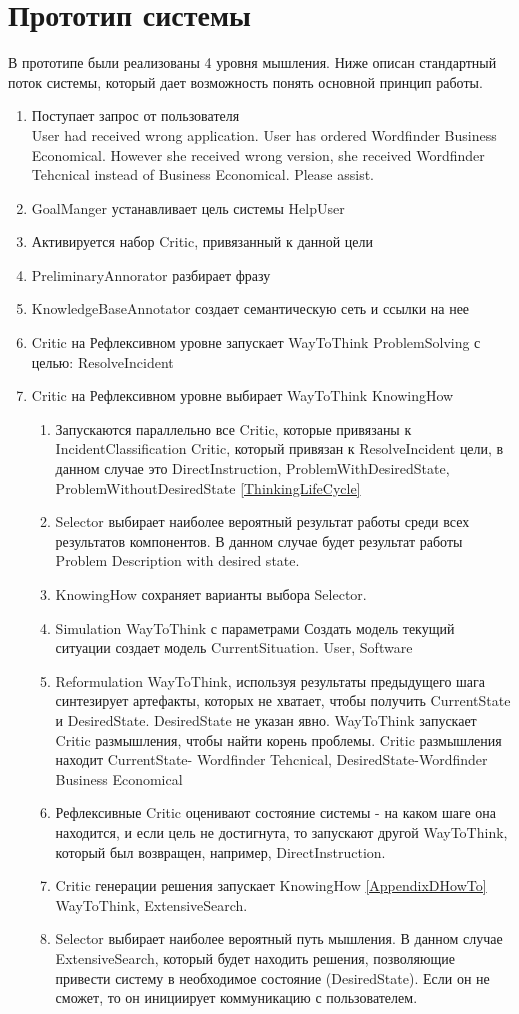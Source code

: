 \section{Прототип системы}
В прототипе были реализованы 4 уровня мышления. Ниже описан стандартный поток системы, который дает возможность понять основной принцип работы.
\begin{enumerate}
	\item Поступает запрос от пользователя \\
	User had received wrong application.
User has ordered Wordfinder Business Economical.
However she received wrong version, she received Wordfinder Tehcnical instead of Business Economical. Please assist.
	\item GoalManger устанавливает цель системы HelpUser
	\item Активируется набор Critic, привязанный к данной цели
	\item PreliminaryAnnorator разбирает фразу
	\item KnowledgeBaseAnnotator создает семантическую сеть и ссылки на нее
	\item Critic на Рефлексивном уровне запускает WayToThink ProblemSolving с целью: ResolveIncident
	\item Critic на Рефлексивном уровне выбирает WayToThink KnowingHow
	\begin{enumerate}
	\item Запускаются параллельно все Critic, которые привязаны к IncidentClassification Critic, который привязан к ResolveIncident цели, в данном случае это DirectInstruction, ProblemWithDesiredState, ProblemWithoutDesiredState \ref{ThinkingLifeCycle}
	\item Selector выбирает наиболее вероятный результат работы среди всех результатов компонентов. В данном случае будет результат работы Problem Description with desired state.
	\item KnowingHow сохраняет варианты выбора Selector.
	\item Simulation WayToThink с параметрами Создать модель текущий ситуации создает модель CurrentSituation. User, Software
	\item Reformulation WayToThink, используя результаты предыдущего шага синтезирует артефакты, которых не хватает, чтобы получить CurrentState и DesiredState. DesiredState не указан явно. WayToThink запускает Critic размышления, чтобы найти корень проблемы. Critic размышления находит CurrentState- Wordfinder Tehcnical, DesiredState-Wordfinder Business Economical
	\item Рефлексивные Critic оценивают состояние системы - на каком шаге она находится, и если цель не достигнута, то запускают другой WayToThink, который был возвращен, например, DirectInstruction. 
	\item Critic генерации решения запускает KnowingHow \ref{AppendixDHowTo} WayToThink, ExtensiveSearch.
	\item Selector выбирает наиболее вероятный путь мышления. В данном случае ExtensiveSearch, который будет находить решения, позволяющие привести систему в необходимое состояние (DesiredState). Если он не сможет, то он инициирует коммуникацию с пользователем. 
	


\end{enumerate}
\end{enumerate}
